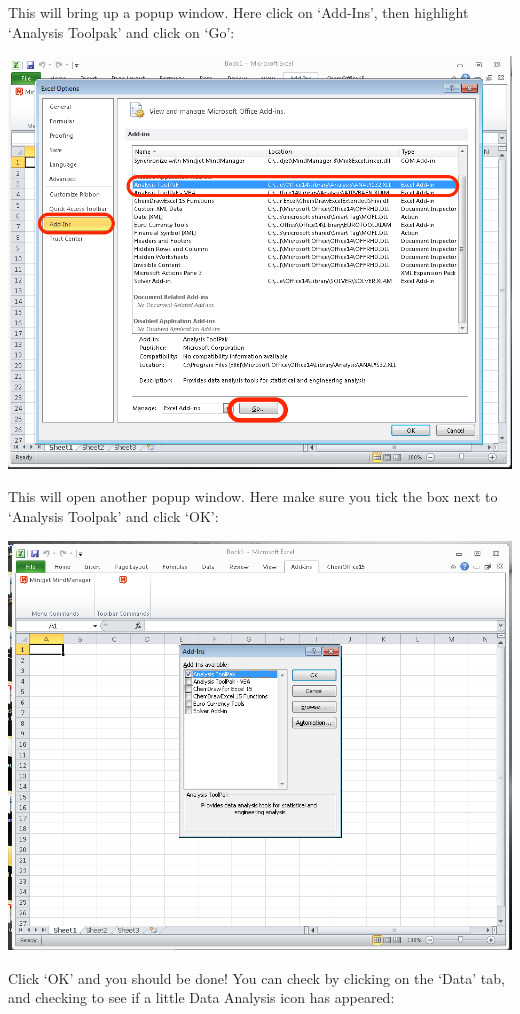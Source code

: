 \documentclass[]{book}
\theoremstyle{definition}
\theoremstyle{definition}
\theoremstyle{definition}
\theoremstyle{remark}
\begin{document}
This will bring up a popup window. Here click on `Add-Ins', then
highlight `Analysis Toolpak' and click on `Go':

\includegraphics{imgs/install_analysis_toolpak.png}

This will open another popup window. Here make sure you tick the box
next to `Analysis Toolpak' and click `OK':

\includegraphics{imgs/install_toolpak_after_go_popup.png}

Click `OK' and you should be done! You can check by clicking on the
`Data' tab, and checking to see if a little Data Analysis icon has
appeared:
\end{document}
